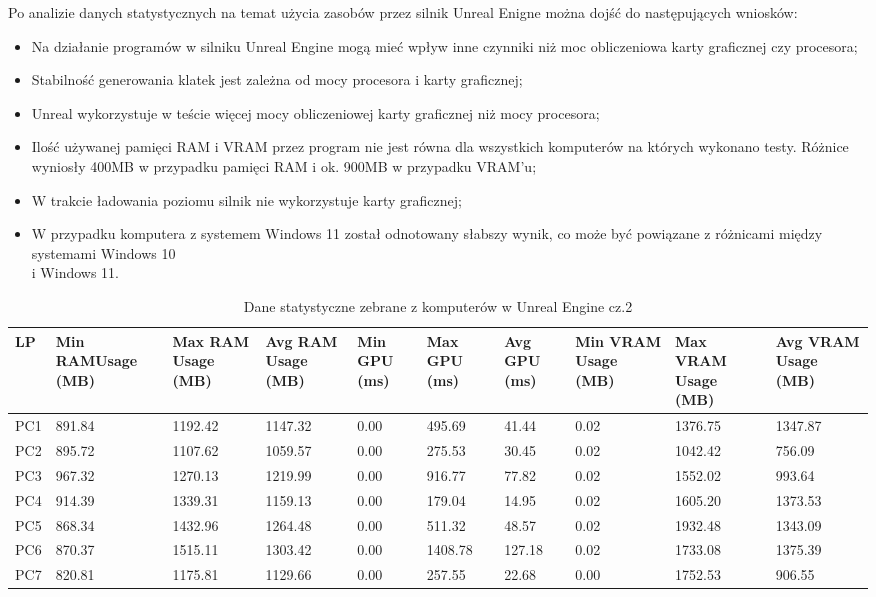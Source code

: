 \documentclass[12pt,twoside]{article}
\begin{document}
Po analizie danych statystycznych na temat użycia zasobów przez silnik Unreal
Enigne można dojść do następujących wniosków:
\begin{itemize}
\item Na działanie programów w silniku Unreal Engine mogą mieć wpływ inne
czynniki niż moc obliczeniowa karty graficznej czy procesora;
\item Stabilność generowania klatek jest zależna od mocy procesora i karty
graficznej;
\item Unreal wykorzystuje w teście więcej mocy obliczeniowej karty graficznej
niż mocy procesora;
\item Ilość używanej pamięci RAM i VRAM przez program nie jest równa dla
wszystkich komputerów na których wykonano testy. Różnice wyniosły 400MB w
przypadku pamięci RAM i ok. 900MB w przypadku VRAM’u;
\item W trakcie ładowania poziomu silnik nie wykorzystuje karty graficznej;
\item W przypadku komputera z systemem Windows 11 został odnotowany słabszy
wynik, co może być powiązane z różnicami między systemami Windows 10\\i Windows
11. 

\end{itemize}
\begin{table}[H]
    \caption{Dane statystyczne zebrane z komputerów w Unreal Engine cz.2}
    \centering		
        \begin{tabular}{|p{1cm}|p{}|p{}|p{}|p{1cm}|p{}|p{1cm}|p{1cm}|p{}|p{}|}	
            \hline
            LP & Min RAMUsage (MB) & Max RAM Usage (MB) & Avg RAM Usage (MB) & Min GPU (ms) & Max GPU (ms)  & Avg GPU (ms) & Min VRAM Usage (MB) & Max VRAM Usage (MB) & Avg VRAM Usage (MB) \\
            \hline
            PC1 & 891.84 & 1192.42 & 1147.32 & 0.00 & 495.69 & 41.44 & 0.02 & 1376.75 & 1347.87 \\
            \hline
            PC2 & 895.72 & 1107.62 & 1059.57 & 0.00 & 275.53 & 30.45 & 0.02 & 1042.42 & 756.09 \\
            \hline
            PC3 & 967.32 & 1270.13 & 1219.99 & 0.00 & 916.77 & 77.82 & 0.02 & 1552.02 & 993.64 \\
            \hline
            PC4 & 914.39 & 1339.31 & 1159.13 & 0.00 & 179.04 & 14.95 & 0.02 & 1605.20 & 1373.53 \\
            \hline
            PC5 & 868.34 & 1432.96 & 1264.48 & 0.00 & 511.32 & 48.57 & 0.02 & 1932.48 & 1343.09 \\
            \hline
            PC6 & 870.37 & 1515.11 & 1303.42 & 0.00 & 1408.78 & 127.18 & 0.02 & 1733.08 & 1375.39 \\
            \hline
            PC7 & 820.81 & 1175.81 & 1129.66 & 0.00 & 257.55 & 22.68 & 0.00 & 1752.53 & 906.55 \\
            \hline
            \hline

        \end{tabular}	
\label{Tabela:StatystykiUnreal2}
\end{table}	
\end{document}
